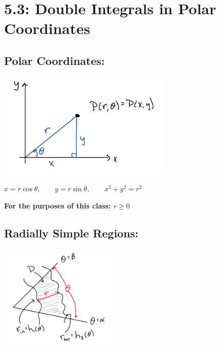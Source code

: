 \section*{5.3: Double Integrals in Polar Coordinates}



\subsection*{Polar Coordinates:}


\includegraphics[height=2in]{Ch12s3-Polar-Coordinates.png}

\(x=r \cos\theta, \qquad y=r\sin\theta, \qquad x^2 + y^2 = r^2\)

\textbf{For the purposes of this class: \(r\geq0\) }\\




\subsection*{Radially Simple Regions:}

\includegraphics[height=2in]{Ch12s3-Radially-Simple.png}

